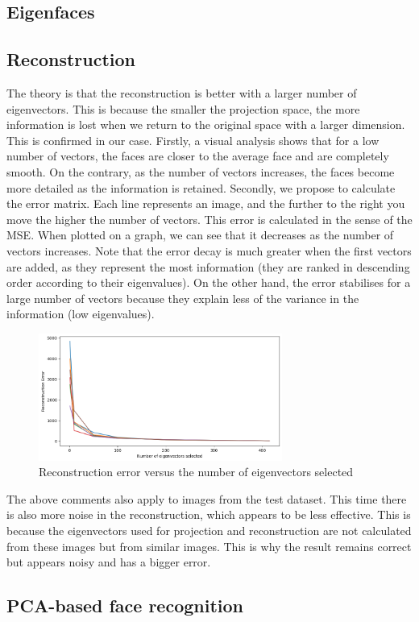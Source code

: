 \subsection{Eigenfaces}

\subsection{Reconstruction}

The theory is that the reconstruction is better with a larger number of eigenvectors. This is because the smaller the projection space, the more information is lost when we return to the original space with a larger dimension. This is confirmed in our case. Firstly, a visual analysis shows that for a low number of vectors, the faces are closer to the average face and are completely smooth. On the contrary, as the number of vectors increases, the faces become more detailed as the information is retained. Secondly, we propose to calculate the error matrix. Each line represents an image, and the further to the right you move the higher the number of vectors. This error is calculated in the sense of the MSE. When plotted on a graph, we can see that it decreases as the number of vectors increases. Note that the error decay is much greater when the first vectors are added, as they represent the most information (they are ranked in descending order according to their eigenvalues). On the other hand, the error stabilises for a large number of vectors because they explain less of the variance in the information (low eigenvalues).

\begin{figure}[h]
	\centering
	\includegraphics[width=8.0cm]{./Ressources/Reconstruction_error.png}
	\vspace{-3mm}
	\caption{Reconstruction error versus the number of eigenvectors selected}
	\label{fig:rect_result}
\end{figure}

The above comments also apply to images from the test dataset. This time there is also more noise in the reconstruction, which appears to be less effective. This is because the eigenvectors used for projection and reconstruction are not calculated from these images but from similar images. This is why the result remains correct but appears noisy and has a bigger error.

\subsection{PCA-based face recognition}






